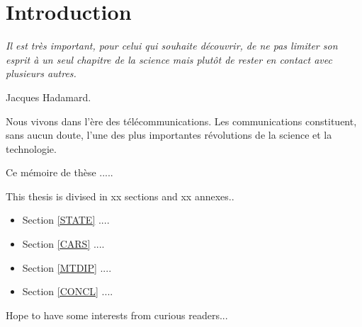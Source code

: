 \chapter{Introduction} \label{INTRO}
\smallskip
\hfill
\begin{minipage}[b]{8cm}
{\it Il est tr\`es important, pour celui qui souhaite d\'ecouvrir, de ne pas limiter son esprit \`a un seul chapitre de la
science mais plut\^ot de rester en contact avec plusieurs autres.}
\end{minipage}
\begin{flushright} Jacques Hadamard. \end{flushright}
\vskip 2cm

{\Huge N}ous vivons dans l'\`ere des t\'el\'ecommunications. Les communications constituent, sans aucun doute, l'une des plus importantes r\'evolutions de la science et la technologie.
\medskip

Ce m\'emoire de th\`ese .....
\bigskip

This thesis is divised in xx sections and xx annexes.. \medskip


\begin{itemize}
    \item Section \ref{STATE} ....  
    \item Section \ref{CARS} ....
    \item Section \ref{MTDIP} ....
    \item Section \ref{CONCL} ....
\end{itemize}

Hope to have some interests from curious readers...


